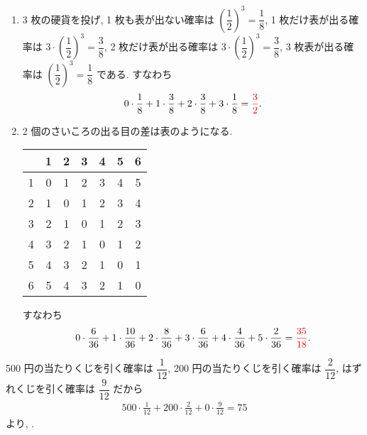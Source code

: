 \begin{enumerate}
	\item{
		3 枚の硬貨を投げ, 1 枚も表が出ない確率は $\left(\dfrac{1}{2}\right)^{3} = \dfrac{1}{8}$, 1 枚だけ表が出る確率は $3\cdot\left(\dfrac{1}{2}\right)^{3} = \dfrac{3}{8}$, 2 枚だけ表が出る確率は $3\cdot\left(\dfrac{1}{2}\right)^{3} = \dfrac{3}{8}$, 3 枚表が出る確率は $\left(\dfrac{1}{2}\right)^{3} = \dfrac{1}{8}$ である.
		すなわち
		\begin{align}
			0\cdot\frac{1}{8} + 1\cdot\frac{3}{8} + 2\cdot\frac{3}{8} + 3\cdot\frac{1}{8} = \textcolor{red}{\frac{3}{2}}.
		\end{align}
	}
	\item{
		2 個のさいころの出る目の差は表のようになる.
		\begin{table}[H]
			\centering
			\begin{tabular}{c|cccccc}
				  & 1 & 2 & 3 & 4 & 5 & 6 \\ \hline
				1 & 0 & 1 & 2 & 3 & 4 & 5 \\
				2 & 1 & 0 & 1 & 2 & 3 & 4 \\
				3 & 2 & 1 & 0 & 1 & 2 & 3 \\
				4 & 3 & 2 & 1 & 0 & 1 & 2 \\
				5 & 4 & 3 & 2 & 1 & 0 & 1 \\
				6 & 5 & 4 & 3 & 2 & 1 & 0
			\end{tabular}
		\end{table}
		すなわち
		\begin{align}
			0\cdot\frac{6}{36} + 1\cdot\frac{10}{36} + 2\cdot\frac{8}{36} + 3\cdot\frac{6}{36} + 4\cdot\frac{4}{36} + 5\cdot\frac{2}{36} = \textcolor{red}{\frac{35}{18}}.
		\end{align}
	}
\end{enumerate}

500 円の当たりくじを引く確率は $\dfrac{1}{12}$, 200 円の当たりくじを引く確率は $\dfrac{2}{12}$, はずれくじを引く確率は $\dfrac{9}{12}$ だから
\begin{align}
	500\cdot\frac{1}{12} + 200\cdot\frac{2}{12} + 0\cdot\frac{9}{12} = 75
\end{align}
より, .

